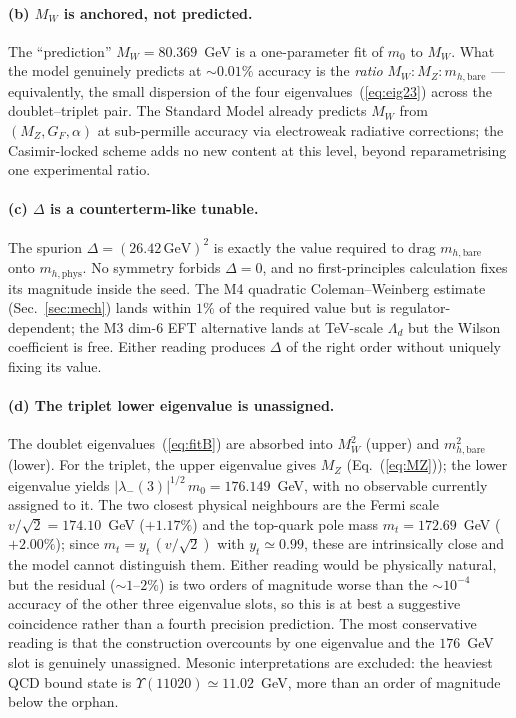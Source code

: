 \documentclass[%
 aps,
 prd,
 reprint,
 nofootinbib,
 superscriptaddress,
 amsmath,
 amssymb,
]{revtex4-2}
\begin{document}
\paragraph{(b) $M_W$ is anchored, not predicted.} The ``prediction'' $M_W=80.369$~GeV is a one-parameter fit of $m_0$ to $M_W$. What the model genuinely predicts at $\sim 0.01\%$ accuracy is the \emph{ratio} $M_W:M_Z:m_{h,\mathrm{bare}}$ --- equivalently, the small dispersion of the four eigenvalues~(\ref{eq:eig23}) across the doublet--triplet pair. The Standard Model already predicts $M_W$ from $(M_Z,G_F,\alpha)$ at sub-permille accuracy via electroweak radiative corrections; the Casimir-locked scheme adds no new content at this level, beyond reparametrising one experimental ratio.

\paragraph{(c) $\Delta$ is a counterterm-like tunable.} The spurion $\Delta=(26.42\,\mathrm{GeV})^2$ is exactly the value required to drag $m_{h,\mathrm{bare}}$ onto $m_{h,\mathrm{phys}}$. No symmetry forbids $\Delta=0$, and no first-principles calculation fixes its magnitude inside the seed. The M4 quadratic Coleman--Weinberg estimate (Sec.~\ref{sec:mech}) lands within $1\%$ of the required value but is regulator-dependent; the M3 dim-6 EFT alternative lands at TeV-scale $\Lambda_d$ but the Wilson coefficient is free. Either reading produces $\Delta$ of the right order without uniquely fixing its value.

\paragraph{(d) The triplet lower eigenvalue is unassigned.} The doublet eigenvalues~(\ref{eq:fitB}) are absorbed into $M_W^2$ (upper) and $m_{h,\mathrm{bare}}^2$ (lower). For the triplet, the upper eigenvalue gives $M_Z$ (Eq.~(\ref{eq:MZ})); the lower eigenvalue yields $|\lambda_-(3)|^{1/2}\,m_0 = 176.149$~GeV, with no observable currently assigned to it. The two closest physical neighbours are the Fermi scale $v/\sqrt{2}=174.10$~GeV ($+1.17\%$) and the top-quark pole mass $m_t=172.69$~GeV ($+2.00\%$); since $m_t=y_t\,(v/\sqrt{2})$ with $y_t\simeq 0.99$, these are intrinsically close and the model cannot distinguish them. Either reading would be physically natural, but the residual ($\sim 1$--$2\%$) is two orders of magnitude worse than the $\sim 10^{-4}$ accuracy of the other three eigenvalue slots, so this is at best a suggestive coincidence rather than a fourth precision prediction. The most conservative reading is that the construction overcounts by one eigenvalue and the $176$~GeV slot is genuinely unassigned. Mesonic interpretations are excluded: the heaviest QCD bound state is $\Upsilon(11020)\simeq 11.02$~GeV, more than an order of magnitude below the orphan.
\end{document}
